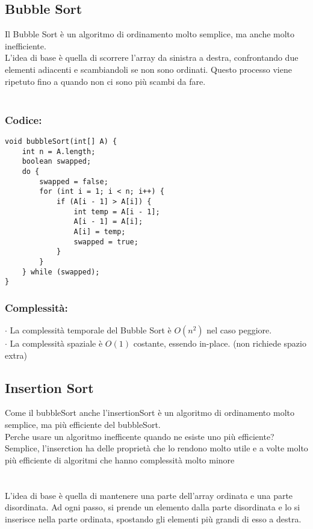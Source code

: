 \documentclass[a4paper,12pt]{article}
\begin{document}
\subsection{Bubble Sort}
Il Bubble Sort è un algoritmo di ordinamento molto semplice, ma anche molto inefficiente. \\
L'idea di base è quella di scorrere l'array da sinistra a destra, confrontando due elementi adiacenti e scambiandoli se non
sono ordinati. Questo processo viene ripetuto fino a quando non ci sono più scambi da fare. \\
\\
\subsubsection{{\textcolor{codice}{Codice: }}}
\begin{lstlisting}[style=mystyle]
void bubbleSort(int[] A) {
    int n = A.length;
    boolean swapped;
    do {
        swapped = false;
        for (int i = 1; i < n; i++) {
            if (A[i - 1] > A[i]) {
                int temp = A[i - 1];
                A[i - 1] = A[i];
                A[i] = temp;
                swapped = true;
            }
        }
    } while (swapped);
}
\end{lstlisting}

\subsubsection*{{\textcolor{teorema}{Complessità: }}}
$\cdot $ La complessità temporale del Bubble Sort è $O(n^2)$ nel caso peggiore. \\
$\cdot $ La complessità spaziale è $O(1)$ costante, essendo in-place. (non richiede spazio extra)

\subsection{Insertion Sort}
Come il bubbleSort anche l'insertionSort è un algoritmo di ordinamento molto semplice, ma più efficiente del bubbleSort. \\
Perche usare un algoritmo inefficente quando ne esiste uno più efficiente? Semplice, l'inserction ha delle proprietà che lo rendono molto utile e a volte molto più efficiente di algoritmi che hanno complessità molto minore \\
\\
\\
L'idea di base è quella di mantenere una parte dell'array ordinata e una parte disordinata. Ad ogni passo, si prende un elemento dalla parte disordinata e lo si inserisce nella parte ordinata, spostando gli elementi più grandi di esso a destra. 
\end{document}
